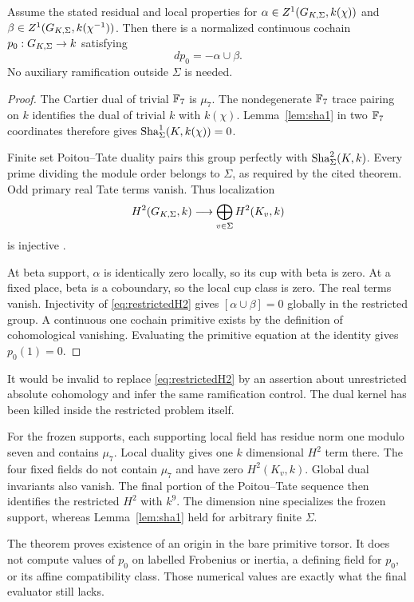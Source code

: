 \begin{theorem}\label{thm:bareprimitive}
Assume the stated residual and local properties for $\alpha\in Z^1(G_{K,\Sigma},k(\chi))$ and $\beta\in Z^1(G_{K,\Sigma},k(\chi^{-1}))$. Then there is a normalized continuous cochain $p_0:G_{K,\Sigma}\to k$ satisfying
\[
dp_0=-\alpha\cup\beta.
\]
No auxiliary ramification outside $\Sigma$ is needed.
\end{theorem}
\begin{proof}
The Cartier dual of trivial $\mathbb F_7$ is $\mu_7$. The nondegenerate $\mathbb F_7$ trace pairing on $k$ identifies the dual of trivial $k$ with $k(\chi)$. Lemma~\ref{lem:sha1} in two $\mathbb F_7$ coordinates therefore gives $\mathop{\mathrm{Sha}}^1_\Sigma(K,k(\chi))=0$.

Finite set Poitou--Tate duality pairs this group perfectly with $\mathop{\mathrm{Sha}}^2_\Sigma(K,k)$. Every prime dividing the module order belongs to $\Sigma$, as required by the cited theorem. Odd primary real Tate terms vanish. Thus localization
\begin{equation}\label{eq:restrictedH2}
H^2(G_{K,\Sigma},k)\longrightarrow\bigoplus_{v\in\Sigma}H^2(K_v,k)
\end{equation}
is injective \cite{milneADT2006}.

At beta support, $\alpha$ is identically zero locally, so its cup with beta is zero. At a fixed place, beta is a coboundary, so the local cup class is zero. The real terms vanish. Injectivity of \eqref{eq:restrictedH2} gives $[\alpha\cup\beta]=0$ globally in the restricted group. A continuous one cochain primitive exists by the definition of cohomological vanishing. Evaluating the primitive equation at the identity gives $p_0(1)=0$.
\end{proof}
It would be invalid to replace \eqref{eq:restrictedH2} by an assertion about unrestricted absolute cohomology and infer the same ramification control. The dual kernel has been killed inside the restricted problem itself.

For the frozen supports, each supporting local field has residue norm one modulo seven and contains $\mu_7$. Local duality gives one $k$ dimensional $H^2$ term there. The four fixed fields do not contain $\mu_7$ and have zero $H^2(K_v,k)$. Global dual invariants also vanish. The final portion of the Poitou--Tate sequence then identifies the restricted $H^2$ with $k^9$. The dimension nine specializes the frozen support, whereas Lemma~\ref{lem:sha1} held for arbitrary finite $\Sigma$.

The theorem proves existence of an origin in the bare primitive torsor. It does not compute values of $p_0$ on labelled Frobenius or inertia, a defining field for $p_0$, or its affine compatibility class. Those numerical values are exactly what the final evaluator still lacks.

